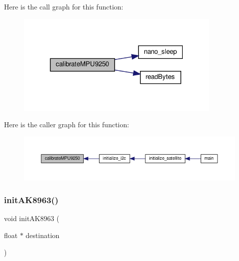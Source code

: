 Here is the call graph for this function\+:\nopagebreak
\begin{figure}[H]
\begin{center}
\leavevmode
\includegraphics[width=279pt]{i2c-interface_8c_a52b2e791d39612643014e3900f1bc7d2_cgraph}
\end{center}
\end{figure}
Here is the caller graph for this function\+:\nopagebreak
\begin{figure}[H]
\begin{center}
\leavevmode
\includegraphics[width=350pt]{i2c-interface_8c_a52b2e791d39612643014e3900f1bc7d2_icgraph}
\end{center}
\end{figure}
\mbox{\label{i2c-interface_8c_a70fbb9dd53a39541d7f04140a2c63f3f}} 
\subsubsection{\texorpdfstring{init\+A\+K8963()}{initAK8963()}}
{\footnotesize\ttfamily void init\+A\+K8963 (\begin{DoxyParamCaption}\item[{float $\ast$}]{destination }\end{DoxyParamCaption})}

